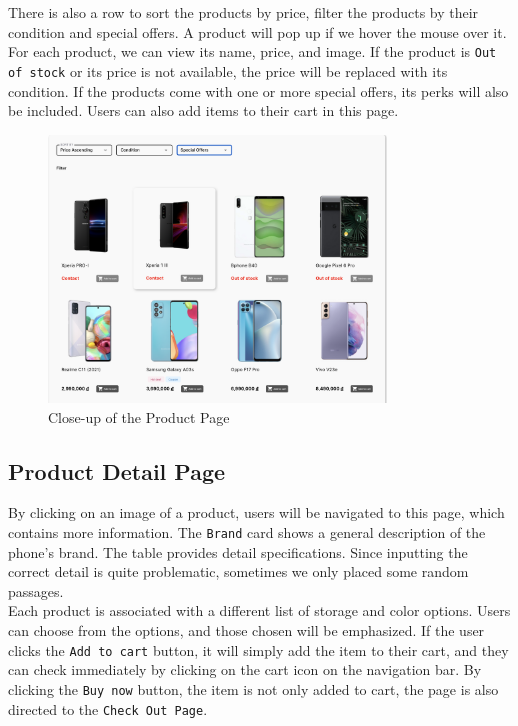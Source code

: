 \documentclass[a4paper]{article}
\numberwithin{equation}{section}
\begin{document}
There is also a row to sort the products by price, filter the products by their condition and special offers.
A product will pop up if we hover the mouse over it.
For each product, we can view its name, price, and image.
If the product is {\tt Out of stock} or its price is not available, the price will be replaced with its condition.
If the products come with one or more special offers, its perks will also be included.
Users can also add items to their cart in this page.

\begin{figure}[H]
  \centering
  \includegraphics[width=0.8\textwidth]{assets/flow/prod.png}
  \caption{Close-up of the Product Page}
\end{figure}

\newpage
\subsection{Product Detail Page}

By clicking on an image of a product, users will be navigated to this page, which contains more information.
The {\tt Brand} card shows a general description of the phone's brand.
The table provides detail specifications.
Since inputting the correct detail is quite problematic, sometimes we only placed some random passages.\\

Each product is associated with a different list of storage and color options.
Users can choose from the options, and those chosen will be emphasized.
If the user clicks the {\tt Add to cart} button, it will simply add the item to their cart, and they can check immediately by clicking on the cart icon on the navigation bar.
By clicking the {\tt Buy now} button, the item is not only added to cart, the page is also directed to the {\tt Check Out Page}.
\end{document}
